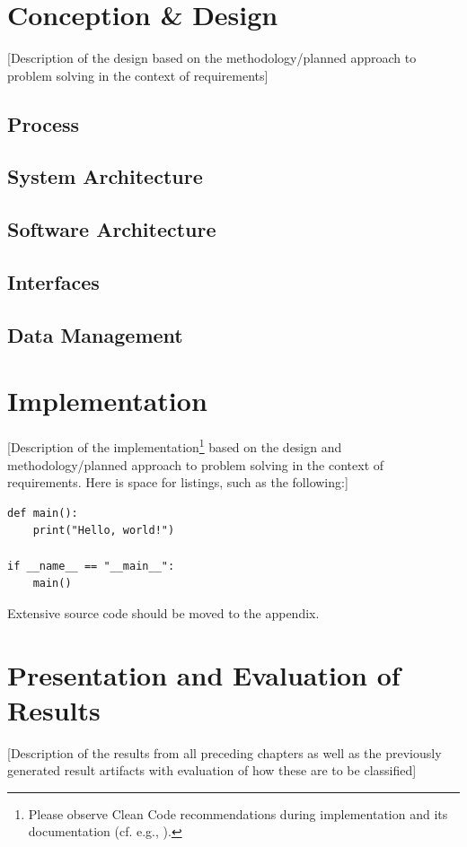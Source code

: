 \documentclass[oneside,bibliography=totocnumbered,BCOR=5mm]{scrbook}
\begin{document}
\chapter{Conception \& Design}
[Description of the design based on the methodology/planned approach to problem solving in the context of requirements]

\section{Process}

\section{System Architecture}

\section{Software Architecture}

\section{Interfaces}

\section{Data Management}


\chapter{Implementation}
[Description of the implementation\footnote{Please observe Clean Code recommendations during implementation and its documentation (cf. e.g., \cite{martin2008}).} based on the design and methodology/planned approach to problem solving in the context of requirements. Here is space for listings, such as the following:]

\begin{lstlisting}[caption={Example: Hello World (Python)}]
def main():
    print("Hello, world!")

if __name__ == "__main__":
    main()
\end{lstlisting}

Extensive source code should be moved to the appendix.

\chapter{Presentation and Evaluation of Results}
[Description of the results from all preceding chapters as well as the previously generated result artifacts with evaluation of how these are to be classified]
\end{document}
